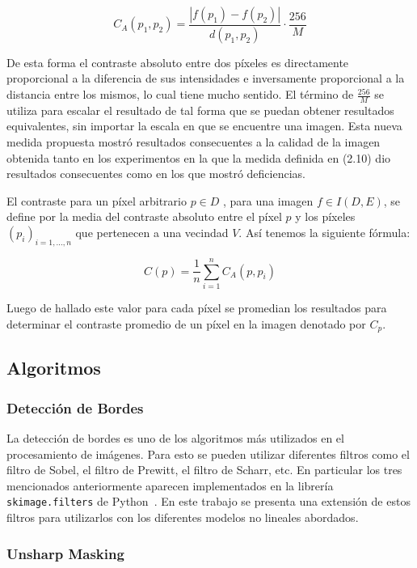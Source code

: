 \begin{equation}
	C_A(p_1,p_2)=\frac{|f(p_1)-f(p_2)|}{d(p_1,p_2)}\cdot\frac{256}{M}
\end{equation}

De esta forma el contraste absoluto entre dos p\'ixeles es directamente proporcional a la diferencia de sus intensidades e inversamente proporcional a la distancia entre los mismos, lo cual tiene mucho sentido. El t\'ermino de $\frac{256}{M}$ se utiliza para escalar el resultado de tal forma que se puedan obtener resultados equivalentes, sin importar la escala en que se encuentre una imagen. Esta nueva medida propuesta mostr\'o resultados consecuentes a la calidad de la imagen obtenida tanto en los experimentos en la que la medida definida en (2.10) dio resultados consecuentes como en los que mostr\'o deficiencias.

El contraste para un píxel arbitrario $p \in D$ , para una imagen $f \in I ( D , E )$, se define por la media del contraste absoluto entre el píxel $p$ y los píxeles $( p_i )_{i = 1,...,n}$ que pertenecen a una vecindad $V$. Así tenemos la siguiente fórmula:

\begin{equation}
	\displaystyle C(p)=\frac{1}{n}\sum_{i=1}^{n}C_A(p,p_i)
\end{equation}

Luego de hallado este valor para cada p\'ixel se promedian los resultados para determinar el contraste promedio de un p\'ixel en la imagen denotado por $C_p$.

\subsection{Algoritmos}

\subsubsection{Detecci\'on de Bordes}

La detecci\'on de bordes es uno de los algoritmos m\'as utilizados en el procesamiento de im\'agenes. Para esto se pueden utilizar diferentes filtros como el filtro de Sobel, el filtro de Prewitt, el filtro de Scharr, etc. En particular los tres mencionados anteriormente aparecen implementados en la librer\'ia \verb|skimage.filters| de Python~\cite{module_filters}. En este trabajo se presenta una extensi\'on de estos filtros para utilizarlos con los diferentes modelos no lineales abordados. 

\subsubsection{Unsharp Masking}

